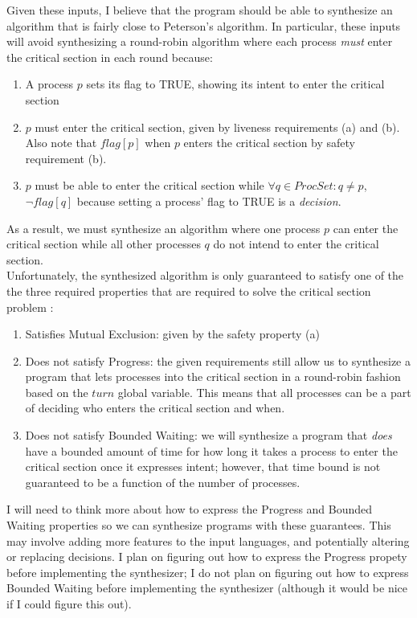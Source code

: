 \documentclass[12pt]{article}
\begin{document}
Given these inputs, I believe that the program should be able to synthesize an algorithm that is fairly close to Peterson's algorithm.  In particular, these inputs will avoid synthesizing a round-robin algorithm where each process \textit{must} enter the critical section in each round because:
	\begin{enumerate}
		\item A process $p$ sets its flag to TRUE, showing its intent to enter the critical section
		\item $p$ must enter the critical section, given by liveness requirements (a) and (b).  Also note that $flag[p]$ when $p$ enters the critical section by safety requirement (b).  
		\item $p$ must be able to enter the critical section while $\forall q \in ProcSet : q \neq p$, $\lnot flag[q]$ because setting a process' flag to TRUE is a \textit{decision}.
	\end{enumerate}
As a result, we must synthesize an algorithm where one process $p$ can enter the critical section while all other processes $q$ do not intend to enter the critical section.  \\

Unfortunately, the synthesized algorithm is only guaranteed to satisfy one of the the three required properties that are required to solve the critical section problem \cite{mutex}:
	\begin{enumerate}
		\item Satisfies Mutual Exclusion: given by the safety property (a)
		\item Does not satisfy Progress: the given requirements still allow us to synthesize a program that lets processes into the critical section in a round-robin fashion based on the $turn$ global variable.  This means that all processes can be a part of deciding who enters the critical section and when.  
		\item Does not satisfy Bounded Waiting: we will synthesize a program that \textit{does} have a bounded amount of time for how long it takes a process to enter the critical section once it expresses intent; however, that time bound is not guaranteed to be a function of the number of processes.  
	\end{enumerate}

I will need to think more about how to express the Progress and Bounded Waiting properties so we can synthesize programs with these guarantees.  This may involve adding more features to the input languages, and potentially altering or replacing decisions.  I plan on figuring out how to express the Progress propety before implementing the synthesizer; I do not plan on figuring out how to express Bounded Waiting before implementing the synthesizer (although it would be nice if I could figure this out).  
\end{document}
